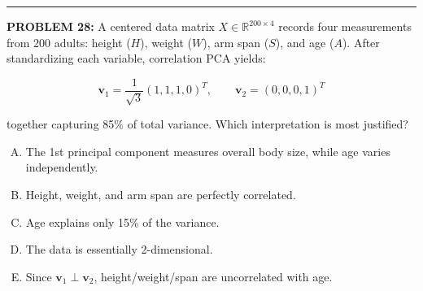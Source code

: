 \documentclass[12pt]{amsart}
\newcommand{\divider}{
  \vspace{-1em} %
  \noindent
  \raisebox{-0.15ex}{\textbullet}%
  \hspace{0.5em}%
  \rule[0.5ex]{0.95\textwidth}{1.0pt}%
  \hspace{0.5em}%
  \raisebox{-0.15ex}{\textbullet}%
  \vspace{0em} %
}
\begin{document}
{%

\divider


{\bf PROBLEM 28:}
% 
A centered data matrix $X \in \mathbb{R}^{200 \times 4}$ records four measurements from 200 adults: height ($H$), weight ($W$), arm span ($S$), and age ($A$). After standardizing each variable, correlation PCA yields:

$$\mathbf{v}_1 = \frac{1}{\sqrt{3}}(1, 1, 1, 0)^T, \qquad \mathbf{v}_2 = (0, 0, 0, 1)^T$$

together capturing 85\% of total variance.
Which interpretation is most justified?

\begin{enumerate}[(A)]
\item The 1st principal component measures overall body size, while age varies independently.
\item Height, weight, and arm span are perfectly correlated.
\item Age explains only 15\% of the variance.
\item The data is essentially 2-dimensional.
\item Since $\mathbf{v}_1 \perp \mathbf{v}_2$, height/weight/span are uncorrelated with age.
\end{enumerate}

%

}
\end{document}
